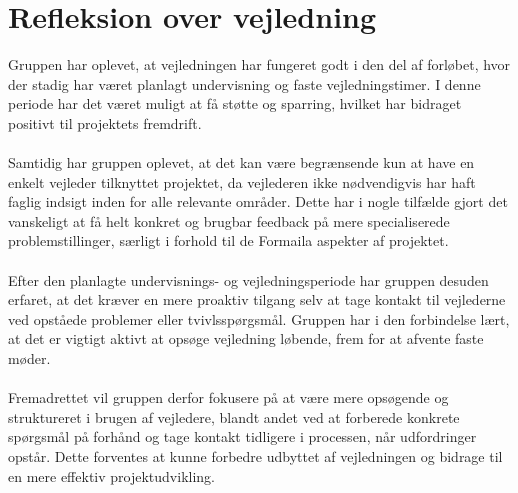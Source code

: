 \section{Refleksion over vejledning}
Gruppen har oplevet, at vejledningen har fungeret godt i den del af forløbet, hvor der stadig har været planlagt undervisning og faste vejledningstimer. I denne periode har det været muligt at få støtte og sparring, hvilket har bidraget positivt til projektets fremdrift.
\\\\
Samtidig har gruppen oplevet, at det kan være begrænsende kun at have en enkelt vejleder tilknyttet projektet, da vejlederen ikke nødvendigvis har haft faglig indsigt inden for alle relevante områder. Dette har i nogle tilfælde gjort det vanskeligt at få helt konkret og brugbar feedback på mere specialiserede problemstillinger, særligt i forhold til de Formaila aspekter af projektet.
\\\\
Efter den planlagte undervisnings- og vejledningsperiode har gruppen desuden erfaret, at det kræver en mere proaktiv tilgang selv at tage kontakt til vejlederne ved opståede problemer eller tvivlsspørgsmål. Gruppen har i den forbindelse lært, at det er vigtigt aktivt at opsøge vejledning løbende, frem for at afvente faste møder.
\\\\
Fremadrettet vil gruppen derfor fokusere på at være mere opsøgende og struktureret i brugen af vejledere, blandt andet ved at forberede konkrete spørgsmål på forhånd og tage kontakt tidligere i processen, når udfordringer opstår. Dette forventes at kunne forbedre udbyttet af vejledningen og bidrage til en mere effektiv projektudvikling.